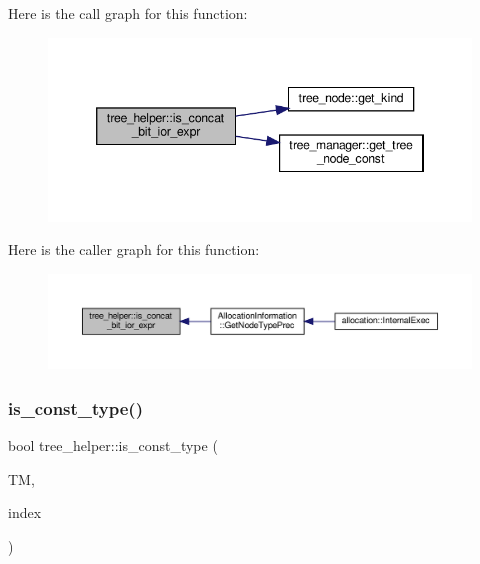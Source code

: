 Here is the call graph for this function\+:
\nopagebreak
\begin{figure}[H]
\begin{center}
\leavevmode
\includegraphics[width=346pt]{d7/d99/classtree__helper_a206f57e4526ced92c69fa511c2ddc2da_cgraph}
\end{center}
\end{figure}
Here is the caller graph for this function\+:
\nopagebreak
\begin{figure}[H]
\begin{center}
\leavevmode
\includegraphics[width=350pt]{d7/d99/classtree__helper_a206f57e4526ced92c69fa511c2ddc2da_icgraph}
\end{center}
\end{figure}
\mbox{\label{classtree__helper_a3553400cf2831632a96c6ceed46aa60b}} 
\subsubsection{\texorpdfstring{is\+\_\+const\+\_\+type()}{is\_const\_type()}}
{\footnotesize\ttfamily bool tree\+\_\+helper\+::is\+\_\+const\+\_\+type (\begin{DoxyParamCaption}\item[{const \hyperlink{tree__manager_8hpp_a792e3f1f892d7d997a8d8a4a12e39346}{tree\+\_\+manager\+Const\+Ref} \&}]{TM,  }\item[{const unsigned int}]{index }\end{DoxyParamCaption})\hspace{0.3cm}{\ttfamily [static]}}



